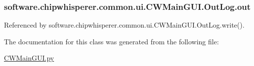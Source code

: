 \subsubsection[{out}]{\setlength{\rightskip}{0pt plus 5cm}software.\+chipwhisperer.\+common.\+ui.\+C\+W\+Main\+G\+U\+I.\+Out\+Log.\+out}\label{classsoftware_1_1chipwhisperer_1_1common_1_1ui_1_1CWMainGUI_1_1OutLog_a74d31e7b8063bd62bff3aafa515f39ff}


Referenced by software.\+chipwhisperer.\+common.\+ui.\+C\+W\+Main\+G\+U\+I.\+Out\+Log.\+write().



The documentation for this class was generated from the following file\+:\begin{DoxyCompactItemize}
\item 
\hyperlink{CWMainGUI_8py}{C\+W\+Main\+G\+U\+I.\+py}\end{DoxyCompactItemize}
